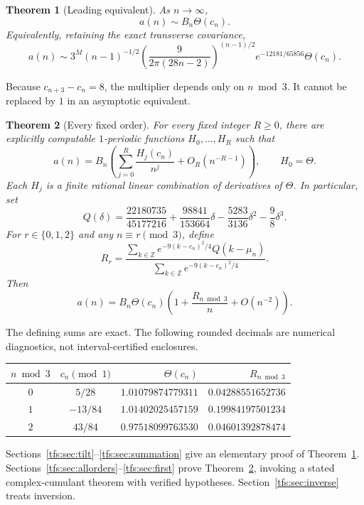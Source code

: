 \documentclass[11pt,a4paper]{article}
\numberwithin{equation}{section}
\newtheorem{theorem}{Theorem}[section]
\theoremstyle{remark}
\newcommand{\Z}{\mathbb Z}
\newcommand{\1}{\mathbf 1}
\begin{document}
\begin{theorem}[Leading equivalent]\label{tfs:thm:leading}
As $n\to\infty$,
\begin{equation}\label{tfs:eq:main}
a(n)\sim B_n\Theta(c_n).
\end{equation}
Equivalently, retaining the exact transverse covariance,
\begin{equation}\label{tfs:eq:exactcarrier}
a(n)\sim 3^M(n-1)^{-1/2}
 \left(\frac9{2\pi(28n-2)}\right)^{(n-1)/2}
 e^{-12181/65856}\Theta(c_n).
\end{equation}
\end{theorem}
Because $c_{n+3}-c_n=8$, the multiplier depends only on $n\bmod 3$.
It cannot be replaced by $1$ in an asymptotic equivalent.

\begin{theorem}[Every fixed order]\label{tfs:thm:allorders}
For every fixed integer $R\geq0$, there are explicitly computable
$1$-periodic functions $H_0,\ldots,H_R$ such that
\begin{equation}\label{tfs:eq:allorders}
a(n)=B_n\left(\sum_{j=0}^R\frac{H_j(c_n)}{n^j}
                   +O_R(n^{-R-1})\right),\qquad H_0=\Theta.
\end{equation}
Each $H_j$ is a finite rational linear combination of derivatives of
$\Theta$. In particular, set
\begin{equation}\label{tfs:eq:Q}
Q(\delta)=\frac{22180735}{45177216}
 +\frac{98841}{153664}\delta-\frac{5283}{3136}\delta^2
 -\frac98\delta^3.
\end{equation}
For $r\in\{0,1,2\}$ and any $n\equiv r\pmod3$, define
\begin{equation}\label{tfs:eq:Rr}
R_r=\frac{\displaystyle\sum_{k\in\Z}e^{-9(k-c_n)^2/4}Q(k-\mu_n)}
           {\displaystyle\sum_{k\in\Z}e^{-9(k-c_n)^2/4}}.
\end{equation}
Then
\begin{equation}\label{tfs:eq:first}
a(n)=B_n\Theta(c_n)\left(1+\frac{R_{n\bmod3}}n+O(n^{-2})\right).
\end{equation}
\end{theorem}
The defining sums are exact. The following rounded decimals are numerical
diagnostics, not interval-certified enclosures.
\begin{center}
\begin{tabular}{@{}ccrr@{}}
\toprule
$n\bmod3$ & $c_n\pmod1$ & $\Theta(c_n)$ & $R_{n\bmod3}$\\
\midrule
$0$ & $5/28$ & $1.01079874779311$ & $0.04288551652736$\\
$1$ & $-13/84$ & $1.01402025457159$ & $0.19984197501234$\\
$2$ & $43/84$ & $0.97518099763530$ & $0.04601392878474$\\
\bottomrule
\end{tabular}
\end{center}
Sections~\ref{tfs:sec:tilt}--\ref{tfs:sec:summation} give an elementary proof of
Theorem~\ref{tfs:thm:leading}. Sections~\ref{tfs:sec:allorders}--\ref{tfs:sec:first}
prove Theorem~\ref{tfs:thm:allorders}, invoking a stated complex-cumulant theorem
with verified hypotheses. Section~\ref{tfs:sec:inverse} treats inversion.
\end{document}
